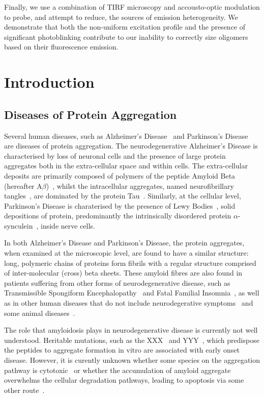 Finally, we use a combination of TIRF microscopy and accousto-optic modulation to probe, and attempt to reduce, the sources of emission heterogeneity. We demonstrate that both the non-uniform excitation profile and the presence of significant photoblinking contribute to our inability to correctly size oligomers based on their fluorescence emission. 

\section{Introduction}
\subsection{Diseases of Protein Aggregation}
Several human diseases, such as Alzheimer's Disease~\cite{???} and Parkinson's Disease~\cite{???} are diseases of protein aggregation. The neurodegenerative Alzheimer's Disease is characterised by loss of neuronal cells and the presence of large protein aggregates both in the extra-cellular space and within cells. The extra-cellular deposits are primarily composed of polymers of the peptide Amyloid Beta (hereafter A${\beta}$)~\cite{???}, whilst the intracellular aggregates, named neurofibrillary tangles~\cite{???}, are dominated by the protein Tau~\cite{???}. Similarly, at the cellular level, Parkinson's Disease is charaterised by the presence of Lewy Bodies~\cite{???}, solid depositions of protein, predominantly the intrinsically disordered protein $\alpha$-synculein~\cite{???}, inside nerve cells.


In both Alzheimer's Disease and Parkinson's Disease, the protein aggregates, when examined at the microscopic level, are found to have a similar structure: long, polymeric chains of proteins form fibrils with a regular structure comprised of inter-molecular (cross) beta sheets. These amyloid fibres are also found in patients suffering from other forms of neurodegenerative disease, such as Transmissible Spongiform Encephalopathy~\cite{???} and Fatal Familial Insomnia~\cite{???}, as well as in other human diseases that do not include neurodegerative symptoms~\cite{??? diabetes, ra} and some animal diseases~\cite{???scrapie}. 


The role that amyloidosis plays in neurodegenerative disease is currently not well understood. Heritable mutations, such as the XXX~\cite{???} and YYY~\cite{???}, which predispose the peptides to aggregate formation in vitro are associated with early onset disease. However, it is curently unknown whether some species on the aggregation pathway is cytotoxic~\cite{???} or whether the accumulation of amyloid aggregate overwhelms the cellular degradation pathways, leading to apoptosis via some other route~\cite{???}.      

